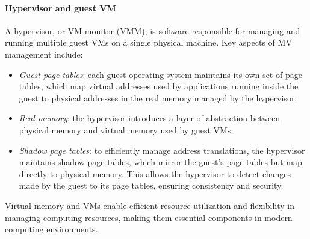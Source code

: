 \paragraph*{Hypervisor and guest VM}
A hypervisor, or VM monitor (VMM), is software responsible for managing and running multiple guest VMs on a single physical machine. 
Key aspects of MV management include:
\begin{itemize}
    \item \textit{Guest page tables}: each guest operating system maintains its own set of page tables, which map virtual addresses used by applications running inside the guest to physical addresses in the real memory managed by the hypervisor.
    \item \textit{Real memory}: the hypervisor introduces a layer of abstraction between physical memory and virtual memory used by guest VMs.
    \item \textit{Shadow page tables}: to efficiently manage address translations, the hypervisor maintains shadow page tables, which mirror the guest's page tables but map directly to physical memory. 
        This allows the hypervisor to detect changes made by the guest to its page tables, ensuring consistency and security.
\end{itemize}
Virtual memory and VMs enable efficient resource utilization and flexibility in managing computing resources, making them essential components in modern computing environments.